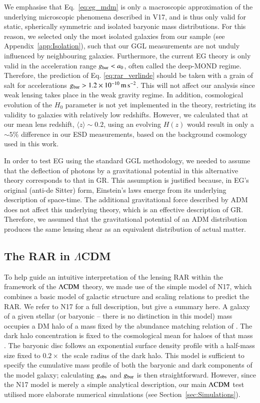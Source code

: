 \documentclass{aa}
\newcommand{\mpss}{\,{\rm m}\,{\rm s}^{-2} }
\newcommand{\lcdm}{{\rm \Lambda CDM}}
\newcommand*{\meanb}[1]{\langle{#1}\rangle}
\newcommand*{\E}[1]{\times 10^{#1}}
\newcommand{\un}[1]{_{\rm #1}}
\begin{document}
We emphasise that Eq.~\ref{eq:eg_mdm} is only a macroscopic approximation of the underlying microscopic phenomena described in V17, and is thus only valid for static, spherically symmetric and isolated baryonic mass distributions. For this reason, we selected only the most isolated galaxies from our sample (see Appendix~\ref{app:Isolation}), such that our GGL measurements are not unduly influenced by neighbouring galaxies. Furthermore, the current EG theory is only valid in the acceleration range $g\un{bar}<a_0$, often called the deep-MOND regime. Therefore, the prediction of Eq. \ref{eq:rar_verlinde} should be taken with a grain of salt for accelerations $g\un{bar}>1.2\E{-10} \mpss$. This will not affect our analysis since weak lensing takes place in the weak gravity regime. In addition, cosmological evolution of the $H_0$ parameter is not yet implemented in the theory, restricting its validity to galaxies with relatively low redshifts. However, we calculated that at our mean lens redshift, $\meanb{z}\sim0.2$, using an evolving $H(z)$ would result in only a $\sim5\%$ difference in our ESD measurements, based on the background cosmology used in this work.

In order to test EG using the standard GGL methodology, we needed to assume that the deflection of photons by a gravitational potential in this alternative theory corresponds to that in GR. This assumption is justified because, in EG's original (anti-de Sitter) form, Einstein's laws emerge from its underlying description of space-time. The additional gravitational force described by ADM does not affect this underlying theory, which is an effective description of GR. Therefore, we assumed that the gravitational potential of an ADM distribution produces the same lensing shear as an equivalent distribution of actual matter.

\subsection{The RAR in $\Lambda$CDM}
\label{sec:N17}

To help guide an intuitive interpretation of the lensing RAR within the framework of the $\lcdm$ theory, we made use of the simple model of N17, which combines a basic model of galactic structure and scaling relations to predict the RAR. We refer to N17 for a full description, but give a summary here. A galaxy of a given stellar (or baryonic -- there is no distinction in this model) mass occupies a DM halo of a mass fixed by the abundance matching relation of \citet{behroozi2013}. The dark halo concentration is fixed to the cosmological mean for haloes of that mass \citep{ludlow2014}. The baryonic disc follows an exponential surface density profile with a half-mass size fixed to $0.2\times$ the scale radius of the dark halo. This model is sufficient to specify the cumulative mass profile of both the baryonic and dark components of the model galaxy; calculating $g\un{obs}$ and $g\un{bar}$ is then straightforward. However, since the N17 model is merely a simple analytical description, our main $\lcdm$ test utilised more elaborate numerical simulations (see Section~\ref{sec:Simulations}).
\end{document}
